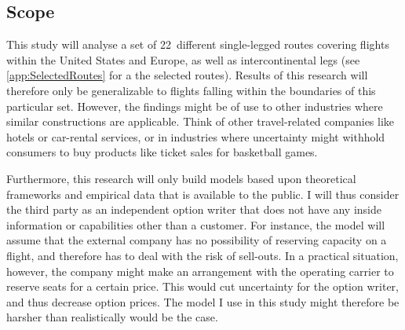 \subsection{Scope}
This study will analyse a set of 22~different single-legged routes covering flights within the United States and Europe, as well as intercontinental legs (see \cref{app:SelectedRoutes} for a the selected routes). Results of this research will therefore only be generalizable to flights falling within the boundaries of this particular set. However, the findings might be of use to other industries where similar constructions are applicable. Think of other travel-related companies like hotels or car-rental services, or in industries where uncertainty might withhold consumers to buy products like ticket sales for basketball games. 

Furthermore, this research will only build models based upon theoretical frameworks and empirical data that is available to the public. I will thus consider the third party as an independent option writer that does not have any inside information or capabilities other than a customer. For instance, the model will assume that the external company has no possibility of reserving capacity on a flight, and therefore has to deal with the risk of sell-outs. In a practical situation, however, the company might make an arrangement with the operating carrier to reserve seats for a certain price. This would cut uncertainty for the option writer, and thus decrease option prices. The model I use in this study might therefore be harsher than realistically would be the case.

